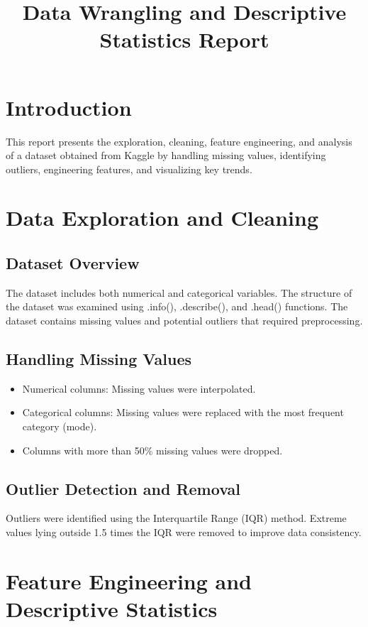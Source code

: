 \documentclass{article}
\begin{document}
\title{Data Wrangling and Descriptive Statistics Report}
\author{}
\date{}
\maketitle

\section{Introduction}
This report presents the exploration, cleaning, feature engineering, and analysis of a dataset obtained from Kaggle by handling missing values, identifying outliers, engineering features, and visualizing key trends.

\section{Data Exploration and Cleaning}

\subsection{Dataset Overview}
The dataset includes both numerical and categorical variables. The structure of the dataset was examined using .info(), .describe(), and .head() functions. The dataset contains missing values and potential outliers that required preprocessing.

\subsection{Handling Missing Values}
\begin{itemize}
    \item Numerical columns: Missing values were interpolated.
    \item Categorical columns: Missing values were replaced with the most frequent category (mode).
    \item Columns with more than 50\% missing values were dropped.
\end{itemize}

\subsection{Outlier Detection and Removal}
Outliers were identified using the Interquartile Range (IQR) method. Extreme values lying outside 1.5 times the IQR were removed to improve data consistency.

\section{Feature Engineering and Descriptive Statistics}
\end{document}

